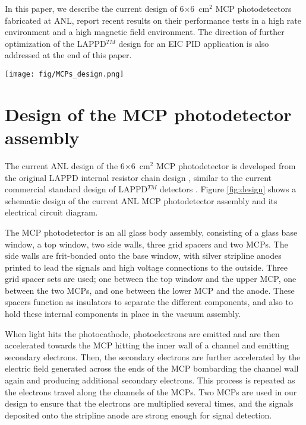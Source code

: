 \documentclass[preprint,5p]{elsarticle}
\begin{document}
In this paper, we describe the current design of 6$\times$6~cm$^2$ MCP 
photodetectors fabricated at ANL, report recent results on their performance tests in a high 
rate environment and a high magnetic field environment. The direction of 
further optimization of the LAPPD$^{TM}$ design for an EIC PID application is 
also addressed at the end of this paper.

\begin{figure*}[tbp]
\centering \texttt{[image: fig/MCPs\_design.png]}
\caption{Schematic of MCP photodetector assembly (not to scale) and the 
   electrical circuit diagram. External connections to the top and bottom 
surfaces of the two MCPs are through ultra-thin metal shims (not shown) to 
special extra striplines on the tile base. The circuit diagram shows 
connections through side wall in a simplified format.} \label{fig:design}
\end{figure*}

\section{Design of the MCP photodetector assembly} \label{sec_design}
The current ANL design of the 6$\times$6~cm$^2$ MCP photodetector is developed 
from the original LAPPD internal resistor chain design \cite{Wang-MCPs2}, 
similar to the current commercial standard design of LAPPD$^{TM}$ detectors 
\cite{Craven-MCPs}. Figure \ref{fig:design} shows a schematic design of the 
current ANL MCP photodetector assembly and its electrical circuit diagram.
 
The MCP photodetector is an all glass body assembly, consisting of a glass base 
window, a top window, two side walls, three grid spacers and two MCPs. The side 
walls are frit-bonded onto the base window, with silver stripline anodes 
printed to lead the signals and high voltage connections to the outside. Three 
grid spacer sets are used; one between the top window and the upper MCP, one 
between the two MCPs, and one between the lower MCP and the anode. These 
spacers function as insulators to separate the different components, and also 
to hold these internal components in place in the vacuum assembly. 

When light hits the photocathode, photoelectrons are emitted and are then 
accelerated towards the MCP hitting the inner wall of a channel and emitting 
secondary electrons. Then, the secondary electrons are further accelerated by 
the electric field generated across the ends of the MCP bombarding the channel 
wall again and producing additional secondary electrons.  This process is 
repeated as the electrons travel along the channels of the MCPs. Two MCPs are 
used in our design to ensure that the electrons are multiplied several times, 
and the signals deposited onto the stripline anode are strong enough for signal 
detection. 
\end{document}
